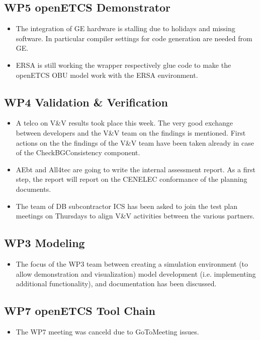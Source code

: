 \documentclass[a4paper, 11pt]{article}
\begin{document}
\subsection{WP5 openETCS Demonstrator}
\begin{itemize}
\item The integration of GE hardware is stalling due to holidays and missing software. In particular compiler settings for code generation are needed from GE. 
\item ERSA is still working the wrapper respectively glue code  to make the openETCS OBU model work with the ERSA environment.
\end{itemize}

\subsection{WP4 Validation \& Verification}
\begin{itemize}
\item A telco on V\&V results took place this week. The very good exchange between developers and the V\&V team on the findings is mentioned. First actions on the the findings of the V\&V team have been taken already in case of the CheckBGConsistency component.
\item AEbt and All4tec are going to write the internal assessment report. As a first step, the report will report on the CENELEC conformance of the planning documents.
\item The team of DB subcontractor ICS has been asked to join the test plan meetings on Thursdays to align V\&V activities between the various partners.
\end{itemize}

\subsection{WP3 Modeling}
\begin{itemize}
\item The focus of the WP3 team between creating a simulation environment (to allow demonstration and visualization) model development (i.e. implementing additional functionality), and documentation has been discussed.
\end{itemize}

\subsection{WP7 openETCS Tool Chain}
\begin{itemize}
\item The WP7 meeting was canceld due to GoToMeeting issues.
\end{itemize}
\end{document}
